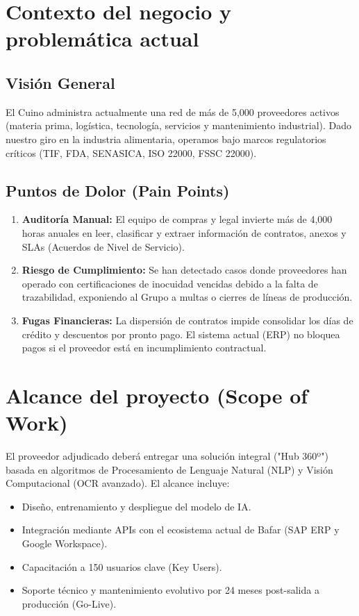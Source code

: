 \documentclass[12pt]{article}
\begin{document}

\section{Contexto del negocio y problemática actual}
\subsection{Visión General}
El Cuino administra actualmente una red de más de 5,000 proveedores activos (materia
prima, logística, tecnología, servicios y mantenimiento industrial). Dado nuestro giro en
la industria alimentaria, operamos bajo marcos regulatorios críticos (TIF, FDA,
SENASICA, ISO 22000, FSSC 22000).

\subsection{Puntos de Dolor (Pain Points)}
\begin{enumerate}
    \item \textbf{Auditoría Manual:} El equipo de compras y legal invierte más de 4,000 horas anuales en leer, clasificar y extraer información de contratos, anexos y SLAs (Acuerdos de Nivel de Servicio).
    \item \textbf{Riesgo de Cumplimiento:} Se han detectado casos donde proveedores han operado con certificaciones de inocuidad vencidas debido a la falta de trazabilidad, exponiendo al Grupo a multas o cierres de líneas de producción.
    \item \textbf{Fugas Financieras:} La dispersión de contratos impide consolidar los días de crédito y descuentos por pronto pago. El sistema actual (ERP) no bloquea pagos si el proveedor está en incumplimiento contractual.
\end{enumerate}


\section{Alcance del proyecto (Scope of Work)}
El proveedor adjudicado deberá entregar una solución integral ("Hub 360º") basada en
algoritmos de Procesamiento de Lenguaje Natural (NLP) y Visión Computacional (OCR
avanzado). El alcance incluye:
\begin{itemize}
\item Diseño, entrenamiento y despliegue del modelo de IA.
\item Integración mediante APIs con el ecosistema actual de Bafar (SAP ERP y
Google Workspace).
\item Capacitación a 150 usuarios clave (Key Users).
\item Soporte técnico y mantenimiento evolutivo por 24 meses post-salida a
producción (Go-Live).
\end{itemize}
\end{document}
